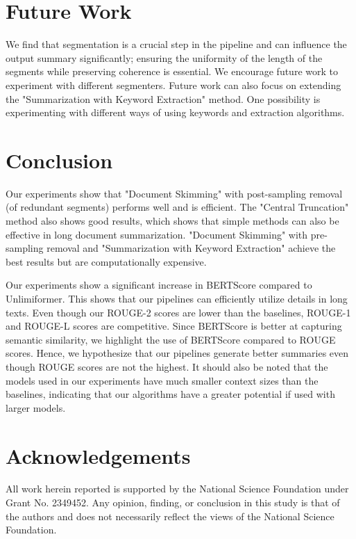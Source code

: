 \documentclass[letterpaper]{article} %
\begin{document}
\section{Future Work}

We find that segmentation is a crucial step in the pipeline and can influence the output summary significantly; ensuring the uniformity of the length of the segments while preserving coherence is essential.
We encourage future work to experiment with different segmenters.
Future work can also focus on extending the "Summarization with Keyword Extraction" method.
One possibility is experimenting with different ways of using keywords and extraction algorithms.


\section{Conclusion}

Our experiments show that "Document Skimming" with post-sampling removal (of redundant segments) performs well and is efficient.
The "Central Truncation" method also shows good results, which shows that simple methods can also be effective in long document summarization.
"Document Skimming" with pre-sampling removal and "Summarization with Keyword Extraction" achieve the best results but are computationally expensive.

Our experiments show a significant increase in BERTScore compared to Unlimiformer.
This shows that our pipelines can efficiently utilize details in long texts.
Even though our ROUGE-2 scores are lower than the baselines, ROUGE-1 and ROUGE-L scores are competitive.
Since BERTScore is better at capturing semantic similarity, we highlight the use of BERTScore compared to ROUGE scores.
Hence, we hypothesize that our pipelines generate better summaries even though ROUGE scores are not the highest.
It should also be noted that the models used in our experiments have much smaller context sizes than the baselines, indicating that our algorithms have a greater potential if used with larger models.


\section*{Acknowledgements}
  
All work herein reported is supported by the National Science Foundation under Grant No. 2349452.
Any opinion, finding, or conclusion in this study is that of the authors and does not necessarily reflect the views of the National Science Foundation.



\end{document}

